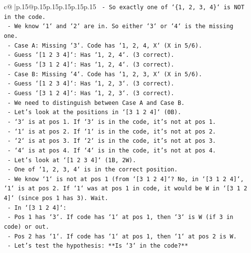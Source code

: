 \documentclass{article}
\begin{document}
{\begin{supertabular}{c@{$\;$}|p{.15\linewidth}@{}p{.15\linewidth}p{.15\linewidth}p{.15\linewidth}p{.15\linewidth}p{.15\linewidth}}
{{{\texttt{            {-} So exactly one of `\{1, 2, 3, 4\}` is NOT in the code.} \\
\texttt{            {-} We know `1` and `2` are in. So either `3` or `4` is the missing one.} \\
\texttt{            {-} Case A: Missing `3`. Code has `1, 2, 4, X` (X in 5/6).} \\
\texttt{                {-} Guess `{[}1 2 3 4{]}`: Has `1, 2, 4`. (3 correct).} \\
\texttt{                {-} Guess `{[}3 1 2 4{]}`: Has `1, 2, 4`. (3 correct).} \\
\texttt{            {-} Case B: Missing `4`. Code has `1, 2, 3, X` (X in 5/6).} \\
\texttt{                {-} Guess `{[}1 2 3 4{]}`: Has `1, 2, 3`. (3 correct).} \\
\texttt{                {-} Guess `{[}3 1 2 4{]}`: Has `1, 2, 3`. (3 correct).} \\
\texttt{        {-} We need to distinguish between Case A and Case B.} \\
\texttt{        {-} Let's look at the positions in `{[}3 1 2 4{]}` (0B).} \\
\texttt{            {-} `3` is at pos 1. If `3` is in the code, it's not at pos 1.} \\
\texttt{            {-} `1` is at pos 2. If `1` is in the code, it's not at pos 2.} \\
\texttt{            {-} `2` is at pos 3. If `2` is in the code, it's not at pos 3.} \\
\texttt{            {-} `4` is at pos 4. If `4` is in the code, it's not at pos 4.} \\
\texttt{        {-} Let's look at `{[}1 2 3 4{]}` (1B, 2W).} \\
\texttt{            {-} One of `1, 2, 3, 4` is in the correct position.} \\
\texttt{            {-} We know `1` is not at pos 1 (from `{[}3 1 2 4{]}`? No, in `{[}3 1 2 4{]}`, `1` is at pos 2. If `1` was at pos 1 in code, it would be W in `{[}3 1 2 4{]}` (since pos 1 has 3). Wait.} \\
\texttt{            {-} In `{[}3 1 2 4{]}`:} \\
\texttt{                {-} Pos 1 has `3`. If code has `1` at pos 1, then `3` is W (if 3 in code) or out.} \\
\texttt{                {-} Pos 2 has `1`. If code has `1` at pos 1, then `1` at pos 2 is W.} \\
\texttt{            {-} Let's test the hypothesis: **Is `3` in the code?**} \\
}}}
\end{supertabular}}
\end{document}
